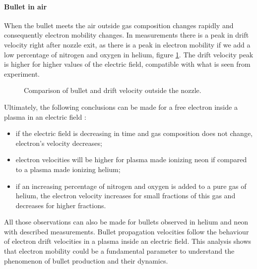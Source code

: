 \paragraph{Bullet in air}
When the bullet meets the air outside gas composition changes rapidly and consequently electron mobility changes. In measurements there is a peak in drift velocity right after nozzle exit, as there is a peak in electron mobility if we add a low percentage of nitrogen and oxygen in helium, figure \ref{fig:muxhe}. The drift velocity peak is higher for higher values of the electric field, compatible with what is seen from experiment.
\begin{figure}
 \hfill
 \caption{Comparison of bullet and drift velocity outside the nozzle.}
 \label{fig:muxhe}
\end{figure}



Ultimately, the following conclusions can be made for a free electron inside a plasma in an electric field :
\begin{itemize}
 \item if the electric field is decreasing in time and gas composition does not change, electron's velocity decreases;
 \item electron velocities will be higher for plasma made ionizing neon if compared to a plasma made ionizing helium;
 \item if an increasing percentage of nitrogen and oxygen is added to a pure gas of helium, the electron velocity increases for small fractions of this gas and decreases for higher fractions.
\end{itemize}
All those observations can also be made for bullets observed in helium and neon with described measurements. Bullet propagation velocities follow the behaviour of electron drift velocities in a plasma inside an electric field. This analysis shows that electron mobility could be a fundamental parameter to understand the phenomenon of bullet production and their dynamics.
